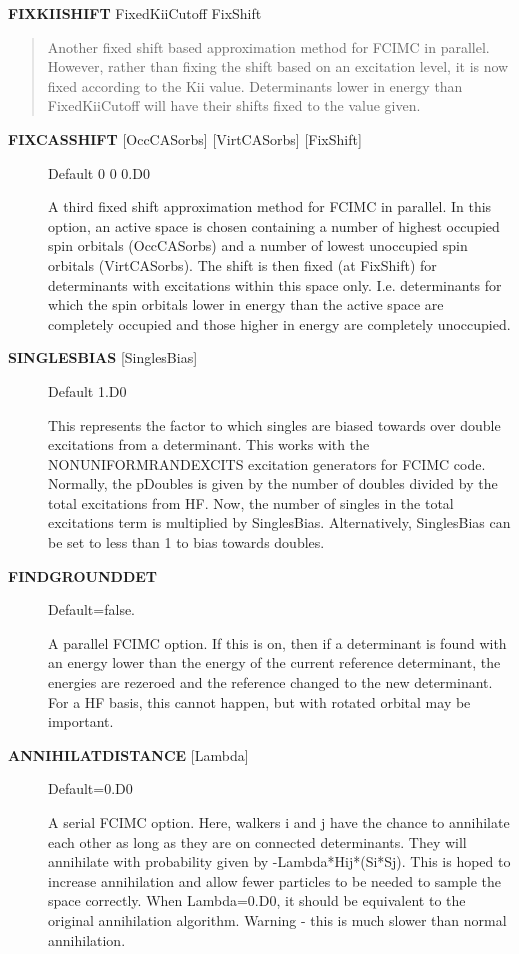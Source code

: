 \documentclass[openany,a4paper,10pt]{manual}
\begin{document}
\textbf{FIXKIISHIFT} FixedKiiCutoff FixShift
\begin{quote}

Another fixed shift based approximation method for FCIMC in parallel. However, rather
than fixing the shift based on an excitation level, it is now fixed according to the
Kii value. Determinants lower in energy than FixedKiiCutoff will have their shifts
fixed to the value given.
\end{quote}
\begin{description}
\item[\textbf{FIXCASSHIFT} {[}OccCASorbs{]} {[}VirtCASorbs{]} {[}FixShift{]}]
Default 0 0 0.D0

A third fixed shift approximation method for FCIMC in parallel.  In this option, an active
space is chosen containing a number of highest occupied spin orbitals (OccCASorbs) and a
number of lowest unoccupied spin orbitals (VirtCASorbs).  The shift is then fixed (at FixShift)
for determinants with excitations within this space only.  I.e. determinants for which the spin
orbitals lower in energy than the active space are completely occupied and those higher in
energy are completely unoccupied.

\item[\textbf{SINGLESBIAS} {[}SinglesBias{]}]
Default 1.D0

This represents the factor to which singles are biased towards over double excitations from a determinant.
This works with the NONUNIFORMRANDEXCITS excitation generators for FCIMC code. Normally, the
pDoubles is given by the number of doubles divided by the total excitations from HF. Now,
the number of singles in the total excitations term is multiplied by SinglesBias. Alternatively,
SinglesBias can be set to less than 1 to bias towards doubles.

\item[\textbf{FINDGROUNDDET}]
Default=false.

A parallel FCIMC option. If this is on, then if a determinant is found with an energy lower
than the energy of the current reference determinant, the energies are rezeroed and the
reference changed to the new determinant. For a HF basis, this cannot happen, but with
rotated orbital may be important.

\item[\textbf{ANNIHILATDISTANCE} {[}Lambda{]}]
Default=0.D0

A serial FCIMC option. Here, walkers i and j have the chance to annihilate each other
as long as they are on connected determinants. They will annihilate with probability
given by -Lambda*Hij*(Si*Sj). This is hoped to increase annihilation and allow fewer
particles to be needed to sample the space correctly. When Lambda=0.D0, it should be
equivalent to the original annihilation algorithm. Warning - this is much slower than
normal annihilation.


\end{description}
\end{document}
